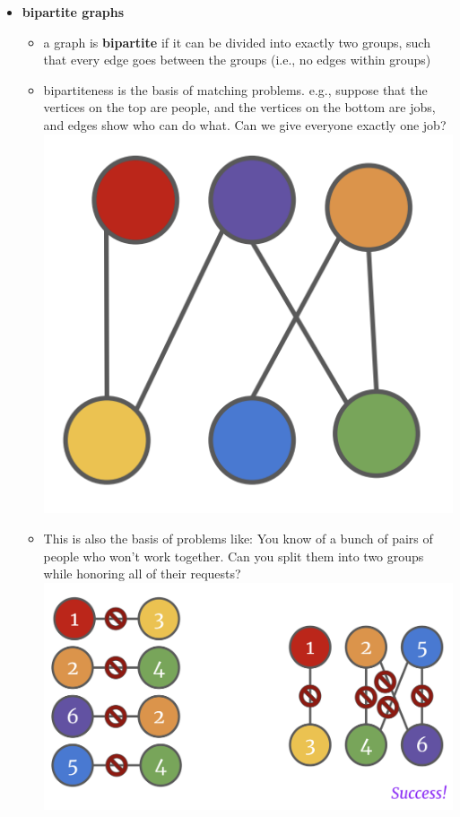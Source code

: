 \documentclass[12pt]{article}
\begin{document}
\begin{itemize}
\begin{itemize}
            \end{itemize} 
    \item \textbf{bipartite graphs}
        \begin{itemize}
            \item a graph is \textbf{bipartite} if it can be divided into exactly two groups, such that every edge goes between the groups (i.e., no edges within groups)
            \item bipartiteness is the basis of matching problems. e.g., suppose that the vertices on the top are people, and the vertices on the bottom are jobs, and edges show who can do what. Can we give everyone exactly one job?
            \\ \includegraphics[scale=0.2]{bipartite.png}
            \item This is also the basis of problems like: You know of a bunch of pairs of people who won't work together. Can you split them into two groups while honoring all of their requests?
            \\ \includegraphics[scale=0.2]{bipartite2.png}

\end{itemize}
\end{itemize}
\end{document}
